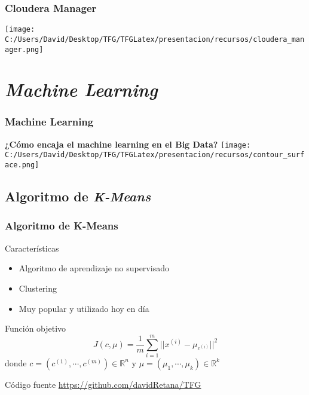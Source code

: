 \documentclass{beamer}
\begin{document}
\begin{frame}
  \frametitle{Cloudera Manager}
  \texttt{[image: C:/Users/David/Desktop/TFG/TFGLatex/presentacion/recursos/cloudera\_manager.png]}
\end{frame}


\section{\textit{Machine Learning}}

\begin{frame} %
\frametitle{Machine Learning}
\textbf{¿Cómo encaja el machine learning en el Big Data?}
\centering
\texttt{[image: C:/Users/David/Desktop/TFG/TFGLatex/presentacion/recursos/contour\_surface.png]}
\end{frame}


\subsection{Algoritmo de \textit{K-Means}}

\begin{frame}[fragile] %
\frametitle{Algoritmo de K-Means}

\begin{block}{Características}
  \begin{itemize}
    \item Algoritmo de aprendizaje no supervisado
    \item Clustering
    \item Muy popular y utilizado hoy en día
  \end{itemize}
\end{block}

\begin{block}{Función objetivo}
  $$ J(c, \mu) = \frac{1}{m} \sum_{i=1}^m || x^{(i)} - \mu_{c^{(i)}} ||^2 $$ 
  donde $c = (c^{(1)}, \cdots, c^{(m)}) \in \mathds{R}^n$ y $\mu = (\mu_1, \cdots, \mu_k) \in \mathds{R}^k$
\end{block}

\begin{block}{Código fuente}
\url{https://github.com/davidRetana/TFG}
\end{block}

\end{frame}
\end{document}

